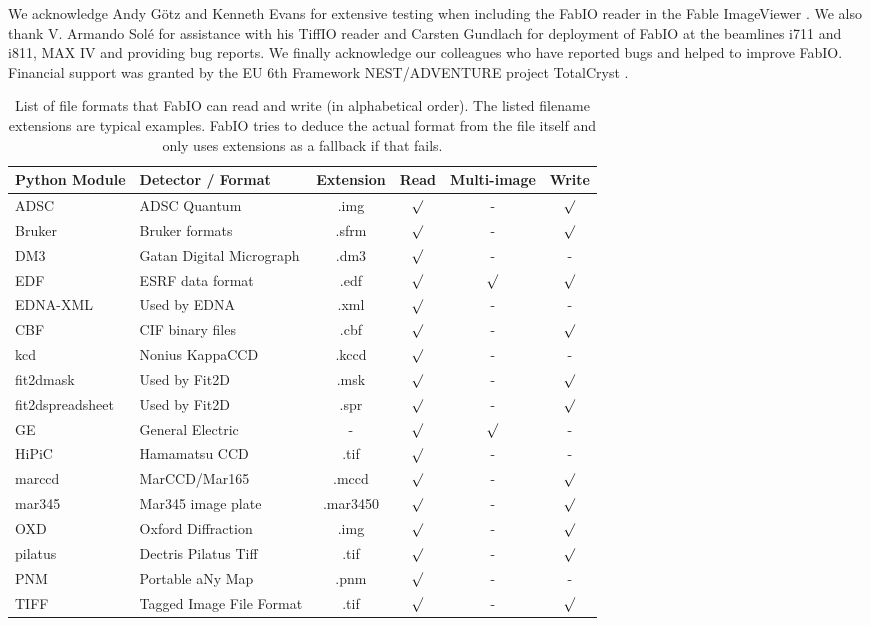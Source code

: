 \documentclass[preprint]{iucr}
\begin{document}

We acknowledge Andy G\"otz and Kenneth Evans for extensive testing when including
the FabIO reader in the Fable ImageViewer \cite{fable}.
We also thank V. Armando Sol\'e for assistance with his TiffIO reader and
Carsten Gundlach for deployment of FabIO at the beamlines i711 and i811, 
MAX IV and providing bug reports.
We finally acknowledge our colleagues who have reported bugs and helped to
improve FabIO.
Financial support was granted by the EU 6th Framework NEST/ADVENTURE project
TotalCryst \cite{totalcryst}.






\begin{table}
\caption{List of file formats that FabIO can read and write (in
alphabetical order). The listed filename extensions are typical examples.
FabIO tries to deduce the actual format from the file itself and only
uses extensions as a fallback if that fails.}
\label{format}
\vspace{1mm}
\begin{center}
\begin{tabular}{llcccc}
Python Module   & Detector / Format		& Extension & Read & Multi-image	& Write\\
\hline 
ADSC		&   ADSC Quantum				&	.img	&	$\surd$&	-	&	$\surd$		\\
Bruker		&   Bruker formats				&	.sfrm	&	$\surd$&	-	&	$\surd$		\\
DM3			&	Gatan Digital Micrograph	&	.dm3	&	$\surd$&	-	&	-	\\
EDF		    &   ESRF data format			&	.edf	&	$\surd$&	$\surd$		&	$\surd$		\\
EDNA-XML	& 	Used by EDNA \cite{edna} 	&	.xml	&	$\surd$&	-	&	-	 \\
CBF		    &   CIF binary files			&	.cbf	&	$\surd$&	- 	& 	$\surd$		\\
kcd	    	&   Nonius 	KappaCCD			&	.kccd	&	$\surd$&	- 	&	-		\\
fit2dmask  	&	Used by Fit2D \cite{fit2d}	&   .msk    &	$\surd$&   -  &   $\surd$  \\
fit2dspreadsheet & Used by Fit2D \cite{fit2d}	&  .spr    &	$\surd$&   -  & $\surd$    \\
GE		    &   General Electric	&	-		&	$\surd$&	$\surd$	&	-		\\
HiPiC       & 	Hamamatsu CCD 		&	.tif	&	$\surd$&	-	&	-	 	\\
marccd		&   MarCCD/Mar165		&	.mccd	&	$\surd$&	-	&	$\surd$		\\
mar345		&   Mar345 image plate	&	.mar3450		&	$\surd$&	-	&	$\surd$		\\
OXD		    &   Oxford Diffraction 	&	.img	&	$\surd$&	-	&	$\surd$		\\
pilatus	    & Dectris Pilatus Tiff	&	.tif	&	$\surd$&	-	&	$\surd$		\\
PNM			&	Portable aNy Map	& .pnm	&	$\surd$&	-	&	-		\\
TIFF		&	Tagged Image File Format	&	.tif	&	$\surd$&	-	&	$\surd$		\\
\end{tabular}
\end{center}
\end{table}
\end{document}
